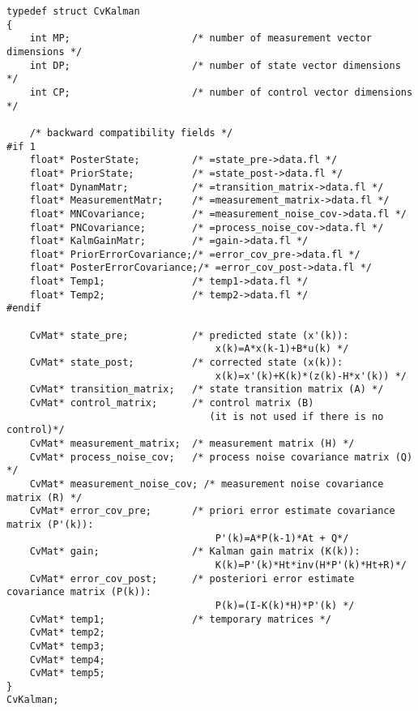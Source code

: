 \ifC
\begin{lstlisting}
typedef struct CvKalman
{
    int MP;                     /* number of measurement vector dimensions */
    int DP;                     /* number of state vector dimensions */
    int CP;                     /* number of control vector dimensions */

    /* backward compatibility fields */
#if 1
    float* PosterState;         /* =state_pre->data.fl */
    float* PriorState;          /* =state_post->data.fl */
    float* DynamMatr;           /* =transition_matrix->data.fl */
    float* MeasurementMatr;     /* =measurement_matrix->data.fl */
    float* MNCovariance;        /* =measurement_noise_cov->data.fl */
    float* PNCovariance;        /* =process_noise_cov->data.fl */
    float* KalmGainMatr;        /* =gain->data.fl */
    float* PriorErrorCovariance;/* =error_cov_pre->data.fl */
    float* PosterErrorCovariance;/* =error_cov_post->data.fl */
    float* Temp1;               /* temp1->data.fl */
    float* Temp2;               /* temp2->data.fl */
#endif

    CvMat* state_pre;           /* predicted state (x'(k)):
                                    x(k)=A*x(k-1)+B*u(k) */
    CvMat* state_post;          /* corrected state (x(k)):
                                    x(k)=x'(k)+K(k)*(z(k)-H*x'(k)) */
    CvMat* transition_matrix;   /* state transition matrix (A) */
    CvMat* control_matrix;      /* control matrix (B)
                                   (it is not used if there is no control)*/
    CvMat* measurement_matrix;  /* measurement matrix (H) */
    CvMat* process_noise_cov;   /* process noise covariance matrix (Q) */
    CvMat* measurement_noise_cov; /* measurement noise covariance matrix (R) */
    CvMat* error_cov_pre;       /* priori error estimate covariance matrix (P'(k)):
                                    P'(k)=A*P(k-1)*At + Q*/
    CvMat* gain;                /* Kalman gain matrix (K(k)):
                                    K(k)=P'(k)*Ht*inv(H*P'(k)*Ht+R)*/
    CvMat* error_cov_post;      /* posteriori error estimate covariance matrix (P(k)):
                                    P(k)=(I-K(k)*H)*P'(k) */
    CvMat* temp1;               /* temporary matrices */
    CvMat* temp2;
    CvMat* temp3;
    CvMat* temp4;
    CvMat* temp5;
}
CvKalman;
\end{lstlisting}
\else
